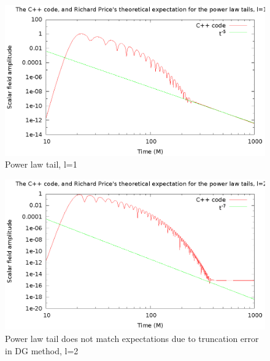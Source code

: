 \begin{figure}
  \includegraphics{l1m1tail2}
  \caption{Power law tail, l=1}
  \label{taill1m1}
\end{figure}

\begin{figure}
  \includegraphics{l2m2tailfail2}
  \caption{Power law tail does not match expectations due to truncation error in DG method, l=2}
  \label{notaill2m2}
\end{figure}

